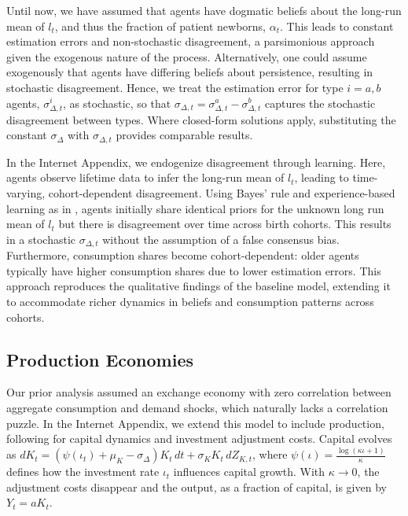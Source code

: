 \documentclass[preprint,11pt,authoryear]{elsarticle}
\theoremstyle{plain}
\begin{document}
Until now, we have assumed that agents have dogmatic beliefs about the long-run mean of \( l_t \), and thus the fraction of patient newborns, \( \alpha_t \). This leads to constant estimation errors and non-stochastic disagreement, a parsimonious approach given the exogenous nature of the process. Alternatively, one could assume exogenously that agents have differing beliefs about persistence, resulting in stochastic disagreement. Hence, we treat the estimation error for type \( i = a, b \) agents, \( \sigma_{\Delta,t}^i \), as stochastic, so that \( \sigma_{\Delta,t} = \sigma_{\Delta,t}^a - \sigma_{\Delta,t}^b \) captures the stochastic disagreement between types. Where closed-form solutions apply, substituting the constant \( \sigma_{\Delta}\) with \( \sigma_{\Delta,t} \) provides comparable results.

In the Internet Appendix, we endogenize disagreement through learning. Here, agents observe lifetime data to infer the long-run mean of \( l_t \), leading to time-varying, cohort-dependent disagreement. Using Bayes' rule and experience-based learning as in \cite{EGH18}, agents initially share identical priors for the unknown long run mean of $l_t$ but there is disagreement over time across birth cohorts. This results in a stochastic \( \sigma_{\Delta,t} \) without the assumption of a false consensus bias. Furthermore, consumption shares become cohort-dependent: older agents typically have higher consumption shares due to lower estimation errors. This approach reproduces the qualitative findings of the baseline model, extending it to accommodate richer dynamics in beliefs and consumption patterns across cohorts.

 

\subsection{Production Economies}\label{sec:Production}

Our prior analysis assumed an exchange economy with zero correlation between aggregate consumption and demand shocks, which naturally lacks a correlation puzzle. In the Internet Appendix, we extend this model to include production, following \cite{BrunnermeierSannikov2014} for capital dynamics and investment adjustment costs. Capital evolves as \( dK_t = \left(\psi(\iota_t) + \mu_K - \sigma_{\Delta}\right) K_t \, dt + \sigma_K K_t \, dZ_{K,t} \), where \( \psi(\iota) = \frac{\log(\kappa \iota + 1)}{\kappa} \) defines how the investment rate \( \iota_t \) influences capital growth. With \( \kappa \to 0 \), the adjustment costs disappear and the output, as a fraction of capital, is given by \( Y_t = a K_t \).
\end{document}
